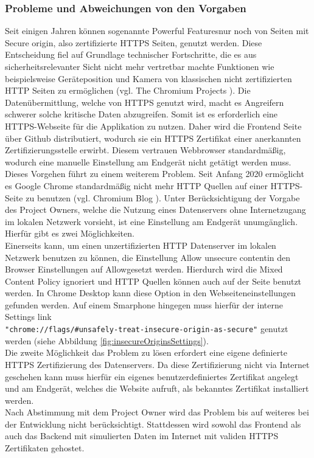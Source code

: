 \subsubsection{Probleme und Abweichungen von den Vorgaben}
Seit einigen Jahren können sogenannte \grqq Powerful Features\grqq\space nur noch von Seiten mit \grqq Secure origin\grqq , also zertifizierte HTTPS Seiten, genutzt werden. Diese Entscheidung fiel auf Grundlage technischer Fortschritte, die es aus sicherheitsrelevanter Sicht nicht mehr vertretbar machte Funktionen wie beispielsweise Geräteposition und Kamera von klassischen nicht zertifizierten HTTP Seiten zu ermöglichen (vgl. The Chromium Projects \cite{CameraHTTPSOnly}). Die Datenübermittlung, welche von HTTPS genutzt wird, macht es Angreifern schwerer solche kritische Daten abzugreifen. Somit ist es erforderlich eine HTTPS-Webseite für die Applikation zu nutzen. Daher wird die Frontend Seite über Github distributiert, wodurch sie ein HTTPS Zertifikat einer anerkannten Zertifizierungsstelle erwirbt. Diesem vertrauen Webbrowser standardmäßig, wodurch eine manuelle Einstellung am Endgerät nicht getätigt werden muss.\\
Dieses Vorgehen führt zu einem weiterem Problem. Seit Anfang 2020 ermöglicht es Google Chrome standardmäßig nicht mehr HTTP Quellen auf einer HTTPS-Seite zu benutzen (vgl. Chromium Blog \cite{MixedSourcesPolicy}). Unter Berücksichtigung der Vorgabe des Project Owners, welche die Nutzung eines Datenservers ohne Internetzugang im lokalen Netzwerk vorsieht, ist eine Einstellung am Endgerät unumgänglich. Hierfür gibt es zwei Möglichkeiten.\\
Einerseits kann, um einen unzertifizierten HTTP Datenserver im lokalen Netzwerk benutzen zu können, die Einstellung \grqq Allow unsecure content\grqq\space in den Browser Einstellungen auf \grqq Allow\grqq\space gesetzt werden. Hierdurch wird die Mixed Content Policy ignoriert und HTTP Quellen können auch auf der Seite benutzt werden. In Chrome Desktop kann diese Option in den Webseiteneinstellungen gefunden werden. Auf einem Smarphone hingegen muss hierfür der interne Settings link\\\verb|"chrome://flags/#unsafely-treat-insecure-origin-as-secure"| genutzt werden (siehe Abbildung \ref{fig:insecureOriginsSettings}).\\
Die zweite Möglichkeit das Problem zu lösen erfordert eine eigene definierte HTTPS Zertifizierung des Datenservers. Da diese Zertifizierung nicht via Internet geschehen kann muss hierfür ein eigenes benutzerdefiniertes Zertifikat angelegt und am Endgerät, welches die Website aufruft, als bekanntes Zertifikat installiert werden.\\ 
Nach Abstimmung mit dem Project Owner wird das Problem bis auf weiteres bei der Entwicklung nicht berücksichtigt. Stattdessen wird sowohl das Frontend als auch das Backend mit simulierten Daten im Internet mit validen HTTPS Zertifikaten gehostet.

